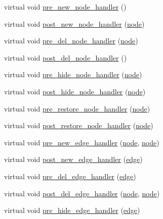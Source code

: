 \begin{DoxyCompactItemize}
\item 
virtual void \mbox{\hyperlink{classgraph_afb7606eaa8d673b6599af24437c0546c}{pre\+\_\+new\+\_\+node\+\_\+handler}} ()
\item 
virtual void \mbox{\hyperlink{classgraph_acfe5bc8bdad9fa426750901144319e5f}{post\+\_\+new\+\_\+node\+\_\+handler}} (\mbox{\hyperlink{classnode}{node}})
\item 
virtual void \mbox{\hyperlink{classgraph_a64699c6cb14cdedab5e13232a8f3e754}{pre\+\_\+del\+\_\+node\+\_\+handler}} (\mbox{\hyperlink{classnode}{node}})
\item 
virtual void \mbox{\hyperlink{classgraph_a4e08a559e3f1007a1a16a53c9a15cb0f}{post\+\_\+del\+\_\+node\+\_\+handler}} ()
\item 
virtual void \mbox{\hyperlink{classgraph_ac169b1dca0b01c97e683302b3908fd49}{pre\+\_\+hide\+\_\+node\+\_\+handler}} (\mbox{\hyperlink{classnode}{node}})
\item 
virtual void \mbox{\hyperlink{classgraph_a50cb72a1e81d0a3d68965a1e6070edb3}{post\+\_\+hide\+\_\+node\+\_\+handler}} (\mbox{\hyperlink{classnode}{node}})
\item 
virtual void \mbox{\hyperlink{classgraph_a3a305d240ab5237a2adae315b50105a6}{pre\+\_\+restore\+\_\+node\+\_\+handler}} (\mbox{\hyperlink{classnode}{node}})
\item 
virtual void \mbox{\hyperlink{classgraph_a2d555506de6aa30bb981f0b60375762d}{post\+\_\+restore\+\_\+node\+\_\+handler}} (\mbox{\hyperlink{classnode}{node}})
\item 
virtual void \mbox{\hyperlink{classgraph_a0a7a68fa0baa47ef955525c445fa1a04}{pre\+\_\+new\+\_\+edge\+\_\+handler}} (\mbox{\hyperlink{classnode}{node}}, \mbox{\hyperlink{classnode}{node}})
\item 
virtual void \mbox{\hyperlink{classgraph_a443182426b461aa9f4b1c9f5ac535179}{post\+\_\+new\+\_\+edge\+\_\+handler}} (\mbox{\hyperlink{classedge}{edge}})
\item 
virtual void \mbox{\hyperlink{classgraph_a2cd0986dc5bcbfdbf0635c39e610784b}{pre\+\_\+del\+\_\+edge\+\_\+handler}} (\mbox{\hyperlink{classedge}{edge}})
\item 
virtual void \mbox{\hyperlink{classgraph_ab9ac8bcc7288986de69cd467beb33600}{post\+\_\+del\+\_\+edge\+\_\+handler}} (\mbox{\hyperlink{classnode}{node}}, \mbox{\hyperlink{classnode}{node}})
\item 
virtual void \mbox{\hyperlink{classgraph_aa33201befa6ad7433becd7424d6de55b}{pre\+\_\+hide\+\_\+edge\+\_\+handler}} (\mbox{\hyperlink{classedge}{edge}})
\item 

\end{DoxyCompactItemize}
